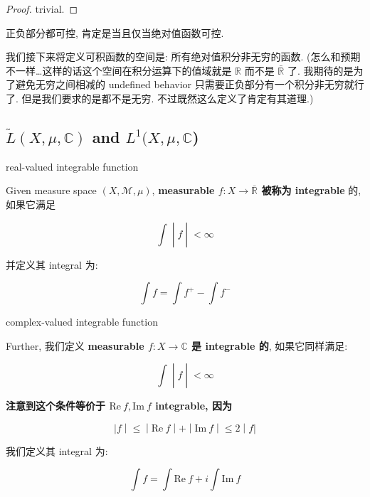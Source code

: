 \documentclass{qlnotes-export}
\begin{document}
\begin{proof}

trivial.

\end{proof}

正负部分都可控, 肯定是当且仅当绝对值函数可控.

我们接下来将定义可积函数的空间是: 所有绝对值积分非无穷的函数. (怎么和预期不一样\ldots 这样的话这个空间在积分运算下的值域就是 \(\mathbb{R}\) 而不是 \(\bar{\mathbb{R}}\) 了. 我期待的是为了避免无穷之间相减的 undefined behavior 只需要正负部分有一个积分非无穷就行了. 但是我们要求的是都不是无穷. 不过既然这么定义了肯定有其道理.)

\subsection{\texorpdfstring{\(\widetilde{L}(X,\mu,{\mathbb{C}})\) and \(L^{1}(X,\mu,{\mathbb{C}}\))}{\textbackslash widetilde\{L\}(X,\textbackslash mu,\{\textbackslash mathbb\{C\}\}) and L\^{}\{1\}(X,\textbackslash mu,\{\textbackslash mathbb\{C\}\})}}\label{widetildelxmumathbbc-and-l1xmumathbbc}

\begin{definition}{real-valued integrable function}\label{def-05-integration-of-real-and-complex-functions-real-valued-integrable-function}

Given measure space \((X,\mathcal{M},\mu)\), \textbf{measurable \(f:X\rightarrow\bar{\mathbb{R}}\) 被称为 integrable} 的, 如果它满足

\[\left. \int \middle| f \middle| < \infty \right.\]

并定义其 integral 为:

\[\int f = \int f^{+} - \int f^{-}\]

\end{definition}

\begin{definition}{complex-valued integrable function}\label{def-05-integration-of-real-and-complex-functions-complex-valued-integrable-function}

Further, 我们定义 \textbf{measurable \(f:X\rightarrow{\mathbb{C}}\) 是 integrable 的}, 如果它同样满足:

\[\left. \int \middle| f \middle| < \infty \right.\]

\textbf{注意到这个条件等价于 \(\text{Re}\ f,\text{Im}\ f\) integrable, 因为}

\[\left. |f \middle| \leq \middle| \text{Re}\ f \middle| + \middle| \text{Im}\ f \middle| \leq 2 \middle| f| \right.\]

我们定义其 integral 为:

\[\int f = \int\text{Re}\ f + i\int\text{Im}\ f\]

\end{definition}
\end{document}

